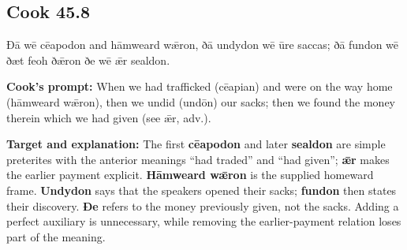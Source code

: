 \par\begin{minipage}{\linewidth}\raggedright
\subsection*{Cook 45.8}

Ðā wē cēapodon and hāmweard wǣron, ðā undydon wē ūre saccas; ðā fundon wē ðæt feoh ðǣron ðe wē ǣr sealdon.

\textbf{Cook’s prompt:} When we had trafficked (cēapian) and were on the way home (hāmweard wǣron), then we undid (undōn) our sacks; then we found the money therein which we had given (see ǣr, adv.).

\textbf{Target and explanation:} The first \textbf{cēapodon} and later \textbf{sealdon} are simple preterites with the anterior meanings “had traded” and “had given”; \textbf{ǣr} makes the earlier payment explicit. \textbf{Hāmweard wǣron} is the supplied homeward frame. \textbf{Undydon} says that the speakers opened their sacks; \textbf{fundon} then states their discovery. \textbf{Ðe} refers to the money previously given, not the sacks. Adding a perfect auxiliary is unnecessary, while removing the earlier-payment relation loses part of the meaning.

\end{minipage}\par\addvspace{4pt}

